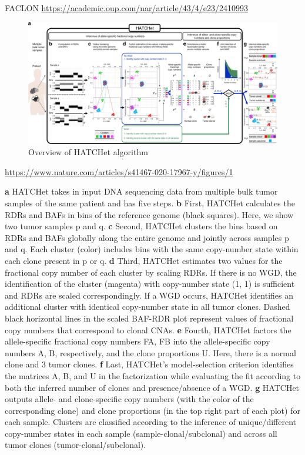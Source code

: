 \documentclass[
]{book}
\begin{document}
FACLON
\url{https://academic.oup.com/nar/article/43/4/e23/2410993}

\begin{figure}
\centering
\includegraphics{./figs/CNV/HATCHet.jpg}
\caption{Overview of HATCHet algorithm}
\end{figure}

\url{https://www.nature.com/articles/s41467-020-17967-y/figures/1}

\textbf{a} HATCHet takes in input DNA sequencing data from multiple bulk tumor samples of the same patient and has five steps.
\textbf{b} First, HATCHet calculates the RDRs and BAFs in bins of the reference genome (black squares). Here, we show two tumor samples p and q.
\textbf{c} Second, HATCHet clusters the bins based on RDRs and BAFs globally along the entire genome and jointly across samples p and q. Each cluster (color) includes bins with the same copy-number state within each clone present in p or q.
\textbf{d} Third, HATCHet estimates two values for the fractional copy number of each cluster by scaling RDRs. If there is no WGD, the identification of the cluster (magenta) with copy-number state (1, 1) is sufficient and RDRs are scaled correspondingly.
If a WGD occurs, HATCHet identifies an additional cluster with identical copy-number state in all tumor clones. Dashed black horizontal lines in the scaled BAF-RDR plot represent values of fractional copy numbers that correspond to clonal CNAs.
\textbf{e} Fourth, HATCHet factors the allele-specific fractional copy numbers FA, FB into the allele-specific copy numbers A, B, respectively, and the clone proportions U. Here, there is a normal clone and 3 tumor clones.
\textbf{f} Last, HATCHet's model-selection criterion identifies the matrices A, B, and U in the factorization while evaluating the fit according to both the inferred number of clones and presence/absence of a WGD.
\textbf{g} HATCHet outputs allele- and clone-specific copy numbers (with the color of the corresponding clone) and clone proportions (in the top right part of each plot) for each sample.
Clusters are classified according to the inference of unique/different copy-number states in each sample (sample-clonal/subclonal) and across all tumor clones (tumor-clonal/subclonal).
\end{document}
